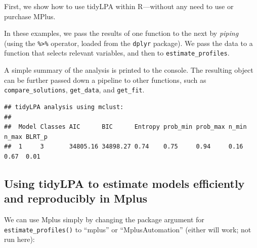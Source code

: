 \documentclass[man]{apa6}
\newenvironment{Shaded}{\begin{snugshade}}{\end{snugshade}}
\newcommand{\DataTypeTok}[1]{\textcolor[rgb]{0.13,0.29,0.53}{#1}}
\newcommand{\DecValTok}[1]{\textcolor[rgb]{0.00,0.00,0.81}{#1}}
\newcommand{\KeywordTok}[1]{\textcolor[rgb]{0.13,0.29,0.53}{\textbf{#1}}}
\newcommand{\NormalTok}[1]{#1}
\newcommand{\OperatorTok}[1]{\textcolor[rgb]{0.81,0.36,0.00}{\textbf{#1}}}
\newcommand{\StringTok}[1]{\textcolor[rgb]{0.31,0.60,0.02}{#1}}
\begin{document}
First, we show how to use tidyLPA within R---without any need to use or purchase MPlus.

In these examples, we pass the results of one function to the next by \emph{piping}
(using the \texttt{\%\textgreater{}\%} operator, loaded from the \texttt{dplyr} package). We pass the data to
a function that selects relevant variables, and then to \texttt{estimate\_profiles}.

A simple summary of the analysis is printed to the console. The resulting object
can be further passed down a pipeline to other functions, such as
\texttt{compare\_solutions}, \texttt{get\_data}, and \texttt{get\_fit}.

\begin{Shaded}
\end{Shaded}

\begin{verbatim}
## tidyLPA analysis using mclust: 
## 
##  Model Classes AIC      BIC      Entropy prob_min prob_max n_min n_max BLRT_p
##  1     3       34805.16 34898.27 0.74    0.75     0.94     0.16  0.67  0.01
\end{verbatim}

\hypertarget{using-tidylpa-to-estimate-models-efficiently-and-reproducibly-in-mplus}{%
\subsection{Using tidyLPA to estimate models efficiently and reproducibly in Mplus}\label{using-tidylpa-to-estimate-models-efficiently-and-reproducibly-in-mplus}}

We can use Mplus simply by changing the package argument for
\texttt{estimate\_profiles()} to \enquote{mplus} or \enquote{MplusAutomation} (either will work; not run
here):

\begin{Shaded}
\end{Shaded}
\end{document}
